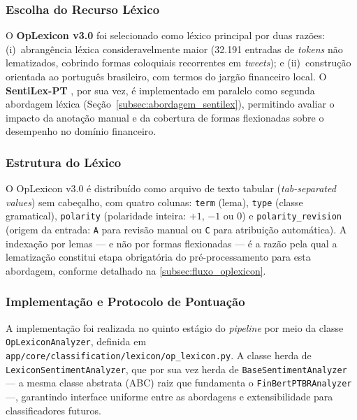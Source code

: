 \subsubsection{Escolha do Recurso Léxico}
\label{subsubsec:escolha_lexico}

O \textbf{OpLexicon v3.0} foi selecionado como léxico principal por duas razões: (i)~abrangência léxica consideravelmente maior (32.191 entradas de \textit{tokens} não lematizados, cobrindo formas coloquiais recorrentes em \textit{tweets}); e (ii)~construção orientada ao português brasileiro, com termos do jargão financeiro local. O \textbf{SentiLex-PT} \cite{carvalho2015sentilex}, por sua vez, é implementado em paralelo como segunda abordagem léxica (Seção~\ref{subsec:abordagem_sentilex}),  permitindo avaliar o impacto da anotação manual e da cobertura de formas flexionadas sobre o desempenho no domínio financeiro.


\subsubsection{Estrutura do Léxico}
\label{subsubsec:estrutura_lexico}

O OpLexicon v3.0 é distribuído como arquivo de texto tabular (\textit{tab-separated values}) sem cabeçalho, com quatro colunas: \texttt{term} (lema), \texttt{type} (classe gramatical), \texttt{polarity} (polaridade inteira: $+1$, $-1$ ou $0$) e \texttt{polarity\_revision} (origem da entrada: \texttt{A} para revisão manual ou \texttt{C} para atribuição automática). A indexação por lemas — e não por formas flexionadas — é a razão pela qual a lematização constitui etapa obrigatória do pré-processamento para esta abordagem, conforme detalhado na \autoref{subsec:fluxo_oplexicon}.

\subsubsection{Implementação e Protocolo de Pontuação}
\label{subsubsec:protocolo_oplexicon}

A implementação foi realizada no quinto estágio do \textit{pipeline} por meio da classe \texttt{OpLexiconAnalyzer}, definida em \texttt{app/core/classification/lexicon/op\_lexicon.py}. A classe herda de \texttt{LexiconSentimentAnalyzer}, que por sua vez herda de \texttt{BaseSentimentAnalyzer} — a mesma classe abstrata (ABC) raiz que fundamenta o
\texttt{FinBertPTBRAnalyzer} —, garantindo interface uniforme entre as abordagens e extensibilidade para classificadores futuros.


